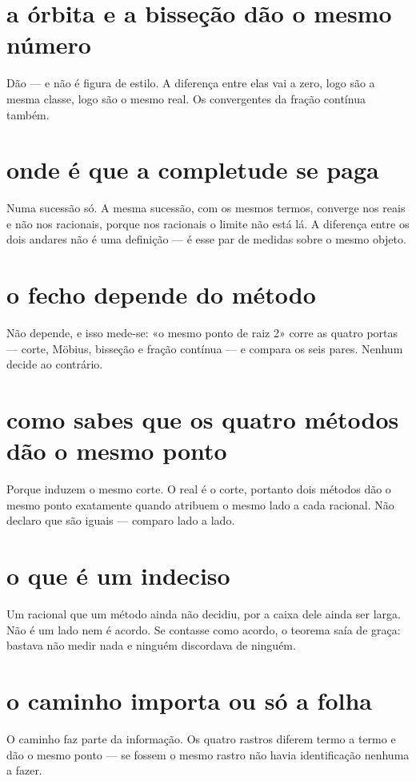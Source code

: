 \documentclass[11pt,a4paper]{article}
\begin{document}
\section{a órbita e a bisseção dão o mesmo número}
Dão --- e não é figura de estilo. A diferença entre elas vai a zero, logo são a mesma
classe, logo são o mesmo real. Os convergentes da fração contínua também.

\section{onde é que a completude se paga}
Numa sucessão só. A mesma sucessão, com os mesmos termos, converge nos reais e não nos
racionais, porque nos racionais o limite não está lá. A diferença entre os dois andares
não é uma definição --- é esse par de medidas sobre o mesmo objeto.

\section{o fecho depende do método}
Não depende, e isso mede-se: «o mesmo ponto de raiz 2» corre as quatro portas --- corte,
Möbius, bisseção e fração contínua --- e compara os seis pares. Nenhum decide ao
contrário.

\section{como sabes que os quatro métodos dão o mesmo ponto}
Porque induzem o mesmo corte. O real é o corte, portanto dois métodos dão o mesmo ponto
exatamente quando atribuem o mesmo lado a cada racional. Não declaro que são iguais ---
comparo lado a lado.

\section{o que é um indeciso}
Um racional que um método ainda não decidiu, por a caixa dele ainda ser larga. Não é um
lado nem é acordo. Se contasse como acordo, o teorema saía de graça: bastava não medir
nada e ninguém discordava de ninguém.

\section{o caminho importa ou só a folha}
O caminho faz parte da informação. Os quatro rastros diferem termo a termo e dão o mesmo
ponto --- se fossem o mesmo rastro não havia identificação nenhuma a fazer.
\end{document}
